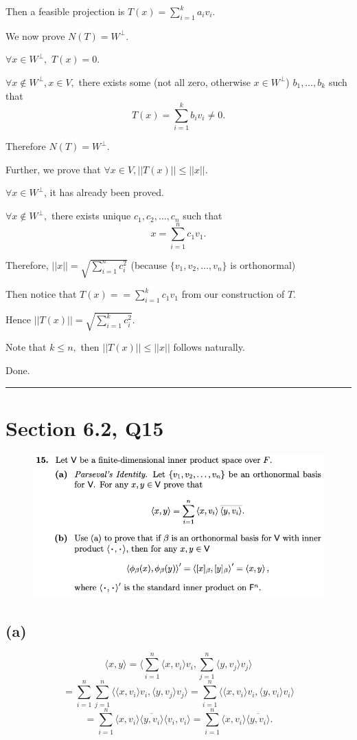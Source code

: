 \documentclass[12pt]{article}%
\begin{document}
Then a feasible projection is $T(x)=\sum_{i=1}^{k}a_iv_i.$

We now prove $N(T)=W^{\perp}.$ 

$\forall x \in W^{\perp},$ $T(x)=0.$

$\forall x \notin W^{\perp}, x\in V,$ there exists some (not all zero, otherwise $x\in W^{\perp}$) $b_1,\dots,b_k$ 
such that $$T(x)=\sum_{i=1}^{k}b_iv_i\neq0.$$

Therefore $N(T)=W^{\perp}.$

Further, we prove that $\forall x \in V, ||T(x)||\leq||x||.$

$\forall x \in W^{\perp}$, it has already been proved.

$\forall x \notin W^{\perp},$ there exists unique $c_1,c_2,\dots,c_n$ such that 
$$x=\sum_{i=1}^{n}c_1v_1.$$

Therefore, $||x||=\sqrt{\sum_{i=1}^{n}c_i^2 }$ (because $\{v_1,v_2,\dots,v_n\}$ is orthonormal)

Then notice that $T(x)==\sum_{i=1}^{k}c_1v_1$ from our construction of $T.$

Hence $||T(x)||=\sqrt{\sum_{i=1}^k c_i^2}$. 

Note that $k \leq n,$ then $||T(x)||\leq ||x||$ follows naturally.

Done.

\noindent\rule[0.1ex]{\linewidth}{1pt}


\newpage

\section{Section 6.2, Q15}
\begin{figure}[htp]
    \includegraphics[width = 14cm]{img/Q15.png}
\end{figure}

\subsection{(a)}
$$\langle x , y  \rangle =\langle \sum_{i=1}^{n}\langle x,v_i\rangle v_i ,\sum_{j=1}^{n}\langle y,v_j\rangle v_j\rangle$$
$$=\sum_{i=1}^{n} \sum_{j=1}^{n} \langle \langle x,v_i\rangle v_i  , \langle y,v_j\rangle v_j \rangle
=\sum_{i=1}^{n} \langle \langle x,v_i\rangle v_i  , \langle y,v_i\rangle v_i \rangle$$
$$=\sum_{i=1}^{n} \langle x,v_i\rangle \overline{\langle y,v_i\rangle} \langle v_i,v_i\rangle
=\sum_{i=1}^{n} \langle x,v_i\rangle \overline{\langle y,v_i\rangle}.$$
\end{document}
